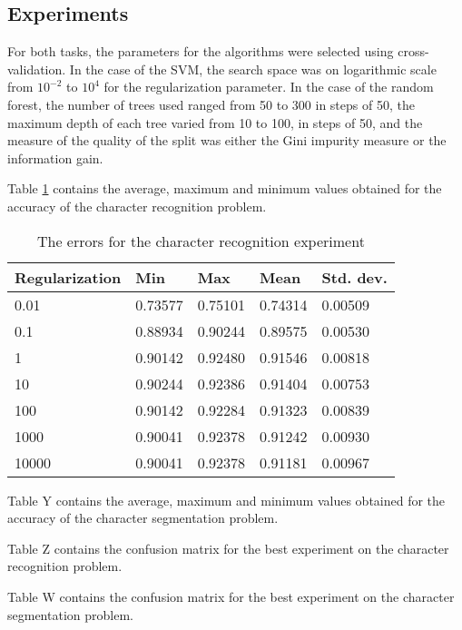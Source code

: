 \subsection{Experiments}

For both tasks, the parameters for the algorithms were selected using cross-validation. In the case of the SVM, the search space was on logarithmic scale from $10^{-2}$ to $10^4$ for the regularization parameter. In the case of the random forest, the number of trees used ranged from 50 to 300 in steps of 50, the maximum depth of each tree varied from 10 to 100, in steps of 50, and the measure of the quality of the split was either the Gini impurity measure or the information gain. 

Table \ref{table:recog_values} contains the average, maximum and minimum values obtained for the accuracy of the character recognition problem.

\begin{table}[h]
\caption{The errors for the character recognition experiment}
\label{table:recog_values}
\begin{tabular}{lllll}
\hline
Regularization & Min     & Max     & Mean    & Std. dev. \\ \hline
0.01           & 0.73577 & 0.75101 & 0.74314 & 0.00509   \\
0.1            & 0.88934 & 0.90244 & 0.89575 & 0.00530   \\
1              & 0.90142 & 0.92480 & 0.91546 & 0.00818   \\
10             & 0.90244 & 0.92386 & 0.91404 & 0.00753   \\
100            & 0.90142 & 0.92284 & 0.91323 & 0.00839   \\
1000           & 0.90041 & 0.92378 & 0.91242 & 0.00930   \\
10000          & 0.90041 & 0.92378 & 0.91181 & 0.00967   \\ \hline
\end{tabular}
\end{table}

Table Y contains the average, maximum and minimum values obtained for the accuracy of the character segmentation problem.

Table Z contains the confusion matrix for the best experiment on the character recognition problem.

Table W contains the confusion matrix for the best experiment on the character segmentation problem.
